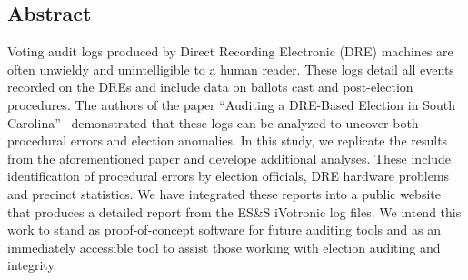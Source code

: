 
\subsection*{Abstract}
Voting audit logs produced by Direct Recording Electronic (DRE) machines are often unwieldy and unintelligible to a human reader. These logs detail all events recorded on the DREs and include data on ballots cast and post-election procedures. The authors of the paper \textquotedblleft Auditing a DRE-Based Election in South Carolina\textquotedblright~\cite{Buell2011} demonstrated that these logs can be analyzed to uncover both procedural errors and  election anomalies.  In this study, we replicate the results from the aforementioned paper and develope additional analyses. These include identification of procedural errors by election officials, DRE hardware problems and precinct statistics. We have integrated these reports into a public website that produces a detailed report from the ES\&S iVotronic log files.  We intend this work to stand as proof-of-concept software for future auditing tools and as an immediately accessible tool to assist those working with election auditing and integrity.

